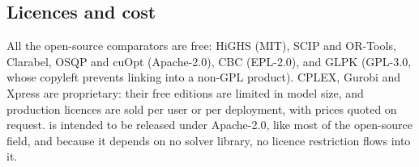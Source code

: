 \subsection{Licences and cost}
All the open-source comparators are free: HiGHS (MIT), SCIP and OR-Tools, Clarabel, OSQP and cuOpt
(Apache-2.0), CBC (EPL-2.0), and GLPK (GPL-3.0, whose copyleft prevents linking into a non-GPL product).
CPLEX, Gurobi and Xpress are proprietary: their free editions are limited in model size, and
production licences are sold per user or per deployment, with prices quoted on request. \nirnay{} is
intended to be released under Apache-2.0, like most of the open-source field, and because it depends
on no solver library, no licence restriction flows into it.
